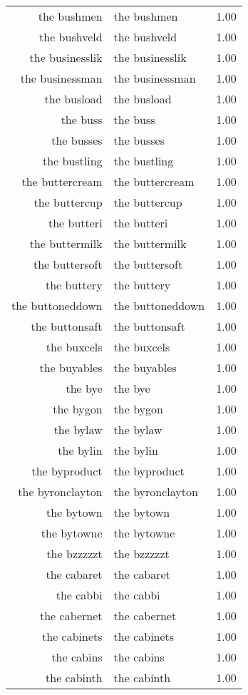 \begin{table}[ht]
\begin{tabular}{rlr}
  the bushmen & the bushmen & 1.00 \\ 
  the bushveld & the bushveld & 1.00 \\ 
  the businesslik & the businesslik & 1.00 \\ 
  the businessman & the businessman & 1.00 \\ 
  the busload & the busload & 1.00 \\ 
  the buss & the buss & 1.00 \\ 
  the busses & the busses & 1.00 \\ 
  the bustling & the bustling & 1.00 \\ 
  the buttercream & the buttercream & 1.00 \\ 
  the buttercup & the buttercup & 1.00 \\ 
  the butteri & the butteri & 1.00 \\ 
  the buttermilk & the buttermilk & 1.00 \\ 
  the buttersoft & the buttersoft & 1.00 \\ 
  the buttery & the buttery & 1.00 \\ 
  the buttoneddown & the buttoneddown & 1.00 \\ 
  the buttonsaft & the buttonsaft & 1.00 \\ 
  the buxcels & the buxcels & 1.00 \\ 
  the buyables & the buyables & 1.00 \\ 
  the bye & the bye & 1.00 \\ 
  the bygon & the bygon & 1.00 \\ 
  the bylaw & the bylaw & 1.00 \\ 
  the bylin & the bylin & 1.00 \\ 
  the byproduct & the byproduct & 1.00 \\ 
  the byronclayton & the byronclayton & 1.00 \\ 
  the bytown & the bytown & 1.00 \\ 
  the bytowne & the bytowne & 1.00 \\ 
  the bzzzzzt & the bzzzzzt & 1.00 \\ 
  the cabaret & the cabaret & 1.00 \\ 
  the cabbi & the cabbi & 1.00 \\ 
  the cabernet & the cabernet & 1.00 \\ 
  the cabinets & the cabinets & 1.00 \\ 
  the cabins & the cabins & 1.00 \\ 
  the cabinth & the cabinth & 1.00 \\ 

\end{tabular}
\end{table}
